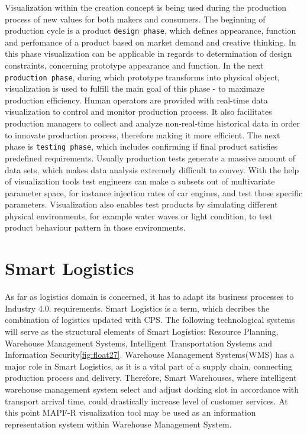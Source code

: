 \documentclass[thesis=B,english]{FITthesis}[2019/12/23]
\begin{document}
Visualization within the creation concept is being used during the production process of new values for both makers and consumers. The beginning of production cycle is a product \verb|design phase|, which defines appearance, function and perfomance of a product based on market demand and creative thinking. In this phase visualization can be applicable in regards to determination of design constraints, concerning prototype appearance and function. In the next \verb|production phase|, during which prototype transforms into physical object, visualization is used to fulfill the main goal of this phase - to maximaze production efficiency. Human operators are provided with real-time data visualization to control and monitor production process. It also facilitates production managers to collect and analyze non-real-time historical data in order to innovate production process, therefore making it more efficient. The next phase is \verb|testing phase|, which includes confirming if final product satisfies predefined requirements. Usually production tests generate a massive amount of data sets, which makes data analysis extremely difficult to convey. With the help of visualization tools test engineers can make a subsets out of multivariate parameter space, for instance injection rates of car engines, and test those specific parameters. Visualization also enables test products by simulating different physical environments, for example water waves or light condition, to test product behaviour pattern in those environments.


\section{Smart Logistics}

As far as logistics domain is concerned, it has to adapt its business processes to Industry 4.0. requirements. Smart Logistics is a term, which decribes the combination of logistics updated with CPS. The following technological systems will serve as the  structural elements of Smart Logistics: Resource Planning, Warehouse Management Systems, Intelligent Transportation Systems and Information Security\ref{fig:float27}. Warehouse Management Systems(WMS) has a major role in Smart Logistics, as it is a vital part of a supply chain, connecting production process and delivery. Therefore, Smart Warehouses, where intelligent warehouse management system select and adjust docking slot in accordance with transport arrival time, could drastically increase level of customer services. At this point MAPF-R visualization tool may be used as an information representation system within Warehouse Management System.
\end{document}

